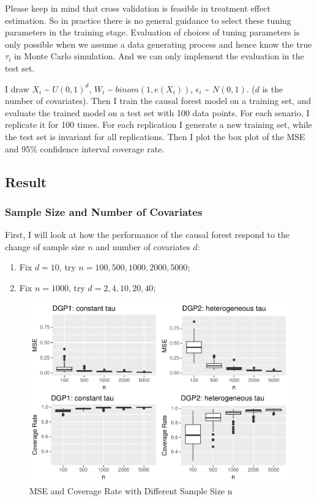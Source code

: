 \documentclass[]{article}
\begin{document}
Please keep in mind that cross validation is feasible in treatment
effect estimation. So in practice there is no general guidance to select
these tuning parameters in the training stage. Evaluation of choices of
tuning parameters is only possible when we assume a data generating
process and hence know the true \(\tau_{i}\) in Monte Carlo simulation.
And we can only implement the evaluation in the test set.

I draw \(X_{i}\) \textasciitilde{} \(U(0,1)^{d}\), \(W_{i}\)
\textasciitilde{} \(binom(1,e(X_{i}))\), \(\epsilon_{i}\)
\textasciitilde{} \(N(0,1)\). (\(d\) is the number of covariates). Then
I train the causal forest model on a training set, and evaluate the
trained model on a test set with 100 data points. For each senario, I
replicate it for 100 times. For each replication I generate a new
training set, while the test set is invariant for all replications. Then
I plot the box plot of the MSE and 95\% confidence interval coverage
rate.

\subsection{Result}\label{result}

\subsubsection{Sample Size and Number of
Covariates}\label{sample-size-and-number-of-covariates}

First, I will look at how the performance of the causal forest respond
to the change of sample size \(n\) and number of covariates \(d\):

\begin{enumerate}
\def\labelenumi{\arabic{enumi}.}
\item
  Fix \(d=10\), try \(n=100, 500, 1000, 2000, 5000\);
\item
  Fix \(n=1000\), try \(d=2, 4, 10, 20, 40\);
\end{enumerate}

\begin{figure}[h!]
\includegraphics{report_files/figure-latex/fig1-1} \caption{\label{fig:fig1}MSE and Coverage Rate with Different Sample Size n}\label{fig:fig1}
\end{figure}
\end{document}
